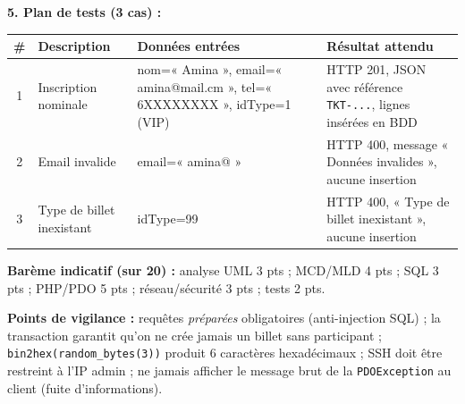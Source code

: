 \documentclass[11pt]{article}
\begin{document}
\begin{corrige}
\textbf{5. Plan de tests (3 cas) :}
\begin{center}
\begin{tabularx}{\linewidth}{|c|X|X|X|}\hline
\rowcolor{popblueL} \textbf{\#} & \textbf{Description} & \textbf{Données entrées} & \textbf{Résultat attendu} \\\hline
1 & Inscription nominale & nom=« Amina », email=« amina@mail.cm », tel=« 6XXXXXXXX », idType=1 (VIP) & HTTP 201, JSON avec référence \texttt{TKT-...}, lignes insérées en BDD \\\hline
2 & Email invalide & email=« amina@ » & HTTP 400, message « Données invalides », aucune insertion \\\hline
3 & Type de billet inexistant & idType=99 & HTTP 400, « Type de billet inexistant », aucune insertion \\\hline
\end{tabularx}
\end{center}

\textbf{Barème indicatif (sur 20) :} analyse UML 3 pts ; MCD/MLD 4 pts ; SQL 3 pts ; PHP/PDO 5 pts ; réseau/sécurité 3 pts ; tests 2 pts.

\textbf{Points de vigilance :} requêtes \emph{préparées} obligatoires (anti-injection SQL) ; la transaction garantit qu'on ne crée jamais un billet sans participant ; \texttt{bin2hex(random\_bytes(3))} produit 6 caractères hexadécimaux ; SSH doit être restreint à l'IP admin ; ne jamais afficher le message brut de la \texttt{PDOException} au client (fuite d'informations).
\end{corrige}
\end{document}
